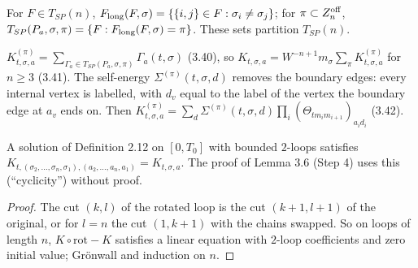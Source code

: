 \begin{definition}\label{def:3.8}
  \leanok
  For $F\in T_{SP}(n)$, $F_{\rm long}(F,\sigma)=\{\{i,j\}\in F:\sigma_i\ne\sigma_j\}$; for
  $\pi\subset Z^{\rm off}_n$, $T_{SP}(P_a,\sigma,\pi)=\{F: F_{\rm long}(F,\sigma)=\pi\}$.  These
  sets partition $T_{SP}(n)$.
\end{definition}

\begin{definition}\label{def:3.9}
  \leanok
  $K^{(\pi)}_{t,\sigma,a}=\sum_{\Gamma_a\in T_{SP}(P_a,\sigma,\pi)}\Gamma_a(t,\sigma)$ (3.40), so
  $K_{t,\sigma,a}=W^{-n+1}m_\sigma\sum_\pi K^{(\pi)}_{t,\sigma,a}$ for $n\ge3$ (3.41).  The
  self-energy $\Sigma^{(\pi)}(t,\sigma,d)$ removes the boundary edges: every internal vertex is
  labelled, with $d_v$ equal to the label of the vertex the boundary edge at $a_v$ ends on.  Then
  $K^{(\pi)}_{t,\sigma,a}=\sum_d\Sigma^{(\pi)}(t,\sigma,d)\prod_i(\Theta_{tm_im_{i+1}})_{a_id_i}$
  (3.42).
\end{definition}

\begin{lemma}\label{lem:K-cyclic}
  \leanok
  A solution of Definition 2.12 on $[0,T_0]$ with bounded $2$-loops satisfies
  $K_{t,(\sigma_2,\dots,\sigma_n,\sigma_1),(a_2,\dots,a_n,a_1)}=K_{t,\sigma,a}$.
  The proof of Lemma 3.6 (Step 4) uses this (``cyclicity'') without proof.
\end{lemma}
\begin{proof}\leanok{}
  The cut $(k,l)$ of the rotated loop is the cut $(k+1,l+1)$ of the original, or for $l=n$
  the cut $(1,k+1)$ with the chains swapped.  So on loops of length $n$, $K\circ\mathrm{rot}-K$
  satisfies a linear equation with $2$-loop coefficients and zero initial value; Gr\"onwall
  and induction on $n$.
\end{proof}

